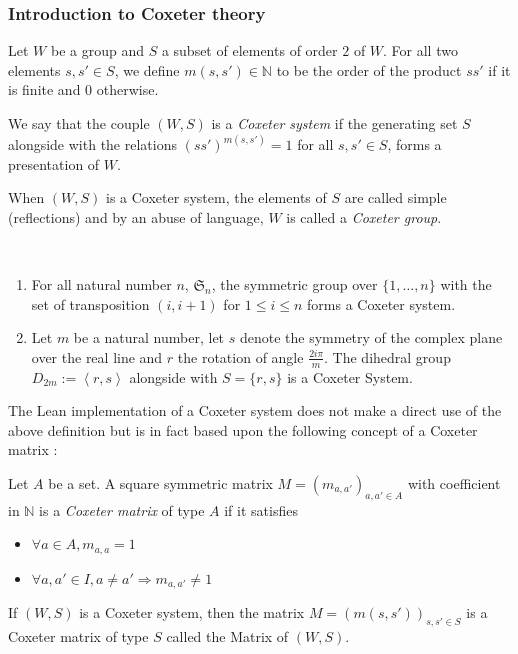 \subsubsection{Introduction to Coxeter theory}
Let $W$ be a group and $S$ a subset of elements of order $2$ of $W$.
For all two elements $s, s' \in  S$, we define $m(s,s') \in  \mathbb{N}$ to be the order of the product $ss'$ if it is finite and $0$ otherwise.

\begin{definition}
    We say that the couple $(W,S)$ is a \emph{Coxeter system} if the generating set $S$ alongside with the relations $(ss')^{m\left( s,s' \right)} = 1$ for all $s,s' \in S$, forms a presentation of $W$.
\end{definition}

When $\left( W,S \right)$ is a Coxeter system, the elements of $S$ are called simple (reflections) and by an abuse of language, $W$ is called a \emph{Coxeter group}.

\begin{ex}\

    \begin{enumerate}
        \item  For all natural number $n$, $\mathfrak{S}_n$, the symmetric group over $\{1,\ldots,n\}$ with the set of transposition $(i,i+1)$ for $1\le i \le n $ forms a Coxeter system.
        \item Let $m$ be a natural number, let $s$ denote the symmetry of the complex plane over the real line and $r$ the rotation of angle $\frac{2i \pi}{m}$. The dihedral group $D_{2m} := \left<r,s\right>$ alongside with $S= \{r,s\}$ is a Coxeter System. 
    \end{enumerate}
\end{ex}

The Lean implementation  of a Coxeter system does not make a direct use of the above definition but is in fact based upon the following concept of a Coxeter matrix :

\begin{definition}
    Let $A$ be a set. A square symmetric matrix $M = \left( m_{a,a'}\right)_{a,a' \in A}$ with coefficient in $\mathbb{N}$ is a \emph{Coxeter matrix} of type $A$ if it satisfies 
\begin{itemize}
    \item $\forall  a \in A, m_{a,a} = 1$
    \item $\forall a,a' \in  I, a \neq  a' \Rightarrow m_{a,a'} \neq 1$
\end{itemize}
 
    If $\left( W,S \right)$ is a Coxeter system, then the matrix $M = \left( m\left( s,s' \right) \right)_{s,s' \in  S}$ is a Coxeter matrix of type $S$ called the Matrix of $\left( W,S \right)$.
\end{definition}

